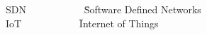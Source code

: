 \nomenclature
\begin{tabbing}
  SDN ~~~~~~~~~~~\= Software Defined Networks\\
  IoT ~~~~~~~~~~~\= Internet of Things\\
\end{tabbing}
\endnomenclature
